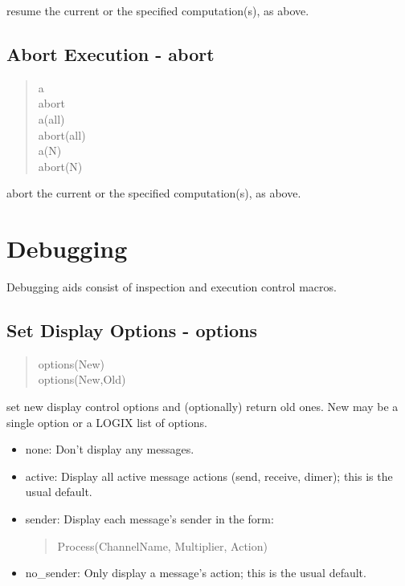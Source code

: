 \noindent
resume the current or the specified computation(s), as above.

\subsection{Abort Execution - abort}

\begin{verse}
    a \\
    abort \\
    a(all) \\
    abort(all) \\
    a(N) \\
    abort(N)
\end{verse}
    
\noindent
abort the current or the specified computation(s), as above.


\section{Debugging}

Debugging aids consist of inspection and execution control macros.

\subsection{Set Display Options - options}
\label{options}

\begin{verse}
    options(New) \\
    options(New,Old)
\end{verse}

\noindent
set new display control options and (optionally) return old ones.
New  may be a single option or a LOGIX list of options.

\begin{itemize}
\item none:     Don't display any messages.
\item active:   Display all active message actions (send, receive, dimer);
                this is the usual default.
\item sender:   Display each message's sender in the form:
\begin{verse}
Process(ChannelName, Multiplier, Action)
\end{verse}
\item no\_sender: Only display a message's action; this is the usual default.
\end{itemize}

